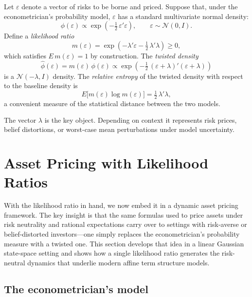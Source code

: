\documentclass[12pt]{article}
\theoremstyle{definition}
\begin{document}
Let $\varepsilon$ denote a vector of risks to be borne and priced.
Suppose that, under the econometrician's probability model,
$\varepsilon$ has a standard multivariate normal density:
\[
   \phi(\varepsilon)  \propto \exp\!\left(- \tfrac{1}{2}\,
       \varepsilon' \varepsilon\right), \qquad
       \varepsilon \sim {\mathcal N}(0,I).
\]
Define a \emph{likelihood ratio}
\[
   m(\varepsilon)  = \exp \!\left( -\lambda' \varepsilon
       - \tfrac{1}{2}\, \lambda' \lambda \right) \geq 0,
\]
which satisfies $E\, m(\varepsilon) = 1$ by construction.  The
\emph{twisted density}
\[
   \hat \phi(\varepsilon)  =  m(\varepsilon)\, \phi(\varepsilon)
   \propto \exp\!\left( - \tfrac{1}{2}\,
       (\varepsilon + \lambda)'(\varepsilon + \lambda)\right)
\]
is a ${\mathcal N}(-\lambda, I)$ density.  The \emph{relative entropy}
of the twisted density with respect to the baseline density is
\[
   E\bigl[ m(\varepsilon) \log m(\varepsilon) \bigr]
       = \tfrac{1}{2}\, \lambda'\lambda,
\]
a convenient measure of the statistical distance between the two models.

The vector $\lambda$ is the key object.  Depending on context it
represents risk prices, belief distortions, or worst-case mean
perturbations under model uncertainty.


\section{Asset Pricing with Likelihood Ratios}
\label{sec:asset-pricing}

With the likelihood ratio in hand, we now embed it in a dynamic asset
pricing framework.  The key insight is that the same formulas used to
price assets under risk neutrality and rational expectations carry over
to settings with risk-averse or belief-distorted investors---one simply
replaces the econometrician's probability measure with a twisted one.
This section develops that idea in a linear Gaussian state-space setting
and shows how a single likelihood ratio generates the risk-neutral
dynamics that underlie modern affine term structure models.

\subsection{The econometrician's model}
\end{document}
